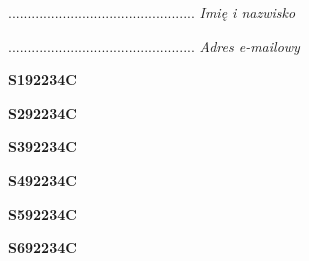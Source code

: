 \begin{turn}{90}\begin{minipage}{\linewidth} \vspace{20mm} ................................................  \textit{Imię i nazwisko}\end{minipage}\end{turn}

\begin{turn}{90}\begin{minipage}{\linewidth} \vspace{20mm} ................................................  \textit{Adres e-mailowy}\end{minipage}\end{turn}

\begin{turn}{90}\huge \begin{minipage}{\linewidth} \vspace{10mm}\textbf{S192234C}\end{minipage}\end{turn}

\begin{turn}{90}\huge \begin{minipage}{\linewidth} \vspace{10mm}\textbf{S292234C}\end{minipage}\end{turn}

\begin{turn}{90}\huge \begin{minipage}{\linewidth} \vspace{10mm}\textbf{S392234C}\end{minipage}\end{turn}

\begin{turn}{90}\huge \begin{minipage}{\linewidth} \vspace{10mm}\textbf{S492234C}\end{minipage}\end{turn}

\begin{turn}{90}\huge \begin{minipage}{\linewidth} \vspace{10mm}\textbf{S592234C}\end{minipage}\end{turn}

\begin{turn}{90}\huge \begin{minipage}{\linewidth} \vspace{10mm}\textbf{S692234C}\end{minipage}\end{turn}

